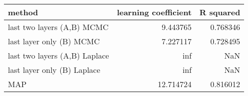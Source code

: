 \begin{tabular}{lrr}
\toprule
                        method &  learning coefficient &  R squared \\
\midrule
    last two layers (A,B) MCMC &              9.443765 &   0.768346 \\
      last layer only (B) MCMC &              7.227117 &   0.728495 \\
 last two layers (A,B) Laplace &                   inf &        NaN \\
   last layer only (B) Laplace &                   inf &        NaN \\
                           MAP &             12.714724 &   0.816012 \\
\bottomrule
\end{tabular}
